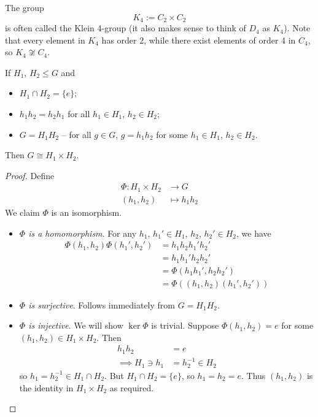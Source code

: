 \documentclass{../../template/note}
\begin{document}
    \begin{example*}
        The group
        \[
            K_4 := C_2 \times C_2
        \]
        is often called the Klein 4-group (it also makes sense to think of \(D_4\) as \(K_4\)). Note that every element in \(K_4\) has order 2, while there exist elements of order 4 in \(C_4\), so \(K_4 \not\cong C_4\).
    \end{example*}

    \begin{theorem}
        If \(H_1\), \(H_2 \leq G\) and
        \begin{itemize}
            \item \(H_1 \cap H_2 = \{e\}\);
            \item \(h_1h_2 = h_2h_1\) for all \(h_1 \in H_1\), \(h_2 \in H_2\);
            \item \(G = H_1H_2\) -- for all \(g \in G\), \(g = h_1h_2\) for some \(h_1 \in H_1\), \(h_2 \in H_2\).
        \end{itemize}
        Then \(G \cong H_1 \times H_2\).
        \label{direct-product-theorem}
    \end{theorem}
    
    \begin{proof}
        Define
        \begin{align*}
            \Phi: H_1 \times H_2 &\to G \\
            (h_1, h_2) &\mapsto h_1h_2
        \end{align*}
        We claim \(\Phi\) is an isomorphism.
        \begin{itemize}
            \item \emph{\(\Phi\) is a homomorphism}. For any \(h_1\), \(h_1' \in H_1\), \(h_2\), \(h_2' \in H_2\), we have
            \begin{align*}
                \Phi(h_1, h_2)\Phi(h_1', h_2') &= h_1h_2h_1'h_2' \\
                &= h_1h_1'h_2h_2' \\
                &= \Phi(h_1h_1', h_2h_2') \\
                &= \Phi((h_1, h_2)(h_1', h_2'))
            \end{align*}
            \item \emph{\(\Phi\) is surjective}. Follows immediately from \(G = H_1H_2\).
            \item \emph{\(\Phi\) is injective}. We will show \(\ker \Phi\) is trivial. Suppose \(\Phi(h_1, h_2) = e\) for some \((h_1, h_2) \in H_1 \times H_2\). Then
            \begin{align*}
                h_1h_2 &= e \\
                \implies H_1 \ni h_1 &= h_2^{-1} \in H_2
            \end{align*}
            so \(h_1 = h_2^{-1} \in H_1 \cap H_2\). But \(H_1 \cap H_2 = \{e\}\), so \(h_1 = h_2 = e\). Thus \((h_1, h_2)\) is the identity in \(H_1 \times H_2\) as required.            
        \end{itemize}
    \end{proof}
    
\end{document}
